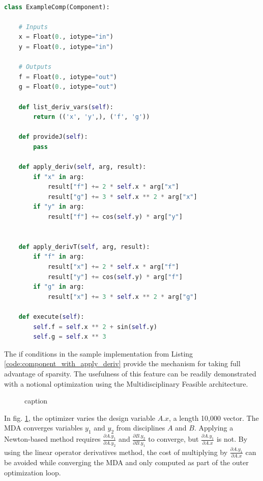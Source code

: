 \documentclass[]{aiaa-tc} %
\begin{document}
\begin{minipage}{\linewidth}
\begin{lstlisting}[label=code:component_with_apply_deriv,caption=Example OpenMDAO
component with apply\_deriv and apply\_derivT methods implemented,
language=Python , basicstyle=\ttfamily\scriptsize,
           keywordstyle=\color{blue}\ttfamily,
           stringstyle=\color{red}\ttfamily, showstringspaces=false,
           commentstyle=\color{olive}\ttfamily]

class ExampleComp(Component):

    # Inputs
    x = Float(0., iotype="in")
    y = Float(0., iotype="in")

    # Outputs
    f = Float(0., iotype="out")
    g = Float(0., iotype="out")

    def list_deriv_vars(self):
        return (('x', 'y',), ('f', 'g'))

    def provideJ(self):
        pass

    def apply_deriv(self, arg, result):
        if "x" in arg: 
            result["f"] += 2 * self.x * arg["x"]
            result["g"] += 3 * self.x ** 2 * arg["x"]
        if "y" in arg: 
            result["f"] += cos(self.y) * arg["y"]
        

    def apply_derivT(self, arg, result):
        if "f" in arg: 
            result["x"] += 2 * self.x * arg["f"]
            result["y"] += cos(self.y) * arg["f"]
        if "g" in arg: 
            result["x"] += 3 * self.x ** 2 * arg["g"]

    def execute(self):
        self.f = self.x ** 2 + sin(self.y)
        self.g = self.x ** 3

\end{lstlisting}
\end{minipage}

    The if conditions in the sample implementation from Listing \ref{code:component_with_apply_deriv} provide the 
    mechanism for taking full advantage of sparsity. The usefulness of this feature can be readily demonstrated with 
    a notional optimization using the Multidisciplinary Feasible architecture\cite{martins:arch:survey}.

    \begin{figure}[htbp]
        \caption{caption}
        \label{fig:MDF:XDSM}
    \end{figure}

    In fig. \ref{fig:MDF:XDSM}, the optimizer varies the design variable $A.x$, a length 10,000 vector. 
    The MDA converges variables $y_1$ and $y_2$ from disciplines $A$ and $B$. Applying a 
    Newton-based method requires $\frac{\partial A.y_1}{\partial A.y_2}$ and $\frac{\partial B.y_2}{\partial B.y_1}$
    to converge, but $\frac{\partial A.y_1}{\partial A.x}$ is not. By using the linear operator derivatives method, 
    the cost of multiplying by $\frac{\partial A.y_1}{\partial A.x}$ can be avoided while converging the MDA and only 
    computed as part of the outer optimization loop. 
\end{document}
